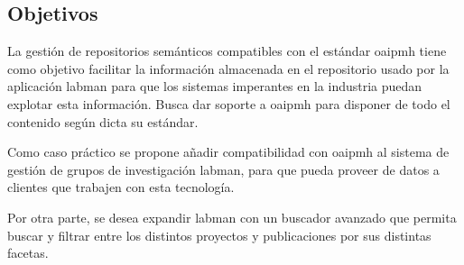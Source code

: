\subsection{Objetivos}

La gestión de repositorios semánticos compatibles con el estándar \acrshort{oaipmh} tiene como objetivo facilitar la información almacenada en el repositorio usado por la aplicación \acrshort{labman} para que los sistemas imperantes en la industria puedan explotar esta información. Busca dar soporte a \acrshort{oaipmh} para disponer de todo el contenido según dicta su estándar.

Como caso práctico se propone añadir compatibilidad con \acrshort{oaipmh} al sistema de gestión de grupos de investigación \acrshort{labman}, para que pueda proveer de datos a clientes que trabajen con esta tecnología.

Por otra parte, se desea expandir \acrshort{labman} con un buscador avanzado que permita buscar y filtrar entre los distintos proyectos y publicaciones por sus distintas facetas.